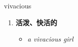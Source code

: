 
\begin{frame}
{\huge vivacious}
\begin{center}
\begin{enumerate}\Large
  \item \textbf{活泼、快活的}
  \begin{itemize}
    \item \em{\Large{a vivacious girl}}
  \end{itemize}
\end{enumerate}
\end{center}
\end{frame}

